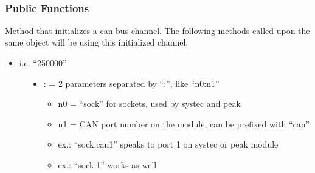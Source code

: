 \documentclass[letterpaper,10pt,english]{sphinxmanual}
\begin{document}
\begin{fulllineitems}
\label{\detokenize{vendors/peak:_CPPv412CSockCanScan}}%
\pysigstartmultiline
{}\label{\detokenize{vendors/peak:classCSockCanScan}}%
\pysigstopmultiline~\subsubsection*{Public Functions}

\begin{fulllineitems}
\label{\detokenize{vendors/peak:_CPPv4N12CSockCanScan9createBusEK6string6string}}%
\pysigstartmultiline
{}\label{\detokenize{vendors/peak:classCSockCanScan_1ac5c669f96d2d6cf7387f8a646bd65b3f}}%
\pysigstopmultiline
Method that initializes a can bus channel. The following methods called upon the same object will be using this initialized channel.

\begin{itemize}
\item {} 
i.e. “250000”

\end{itemize}
\begin{description}
\item[{}] \leavevmode\begin{itemize}
\item {} 
: = 2 parameters separated by “:”, like “n0:n1”\begin{itemize}
\item {} 
n0 = “sock” for sockets, used by systec and peak

\item {} 
n1 = CAN port number on the module, can be prefixed with “can”

\item {} 
ex.: “sock:can1” speaks to port 1 on systec or peak module

\item {} 
ex.: “sock:1” works as well


\end{itemize}
\end{itemize}
\end{description}
\end{fulllineitems}
\end{fulllineitems}
\end{document}
